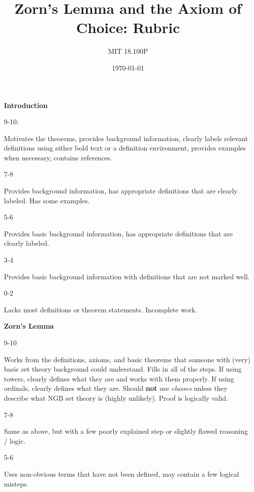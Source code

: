 \documentclass{article}
\title{Zorn's Lemma and the Axiom of Choice: Rubric}
\author{MIT 18.100P}
\date{\today}
\begin{document}
    \textbf{Introduction}
    \par\hfill\par
    9-10:
    \par
    Motivates the theorems, provides background information,
    clearly labels relevant definitions using either bold text or
    a definition environment, provides examples when necessary,
    contains references.
    \par\hfill\par
    7-8
    \par
    Provides background information, has appropriate definitions
    that are clearly labeled. Has some examples.
    \par\hfill\par
    5-6
    \par
    Provides basic background information, has appropriate
    definitions that are clearly labeled.
    \par\hfill\par
    3-4
    \par
    Provides basic background information with definitions
    that are not marked well.
    \par\hfill\par
    0-2
    \par
    Lacks most definitions or theorem statements. Incomplete work.
    \par\hfill\par
    \textbf{Zorn's Lemma}
    \par\hfill\par
    9-10
    \par
    Works from the definitions, axioms, and basic theorems that
    someone with (very) basic set theory background could
    understand. Fills in all of the steps. If using towers, clearly
    defines what they are and works with them properly. If using
    ordinals, clearly defines what they are. Should \textbf{not}
    use \textit{classes} unless they describe what NGB set theory
    is (highly unlikely). Proof is logically valid.
    \par\hfill\par
    7-8
    \par
    Same as above, but with a few poorly explained step or slightly
    flawed reasoning / logic.
    \par\hfill\par
    5-6
    \par
    Uses non-obvious terms that have not been defined, may contain a few
    logical misteps.
\end{document}
